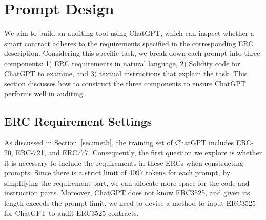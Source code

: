
\section{Prompt Design}







We aim to build an auditing tool using ChatGPT, 
which can inspect whether a smart contract adheres to the requirements specified 
in the corresponding ERC description. 
Considering this specific task, we break down each prompt into three components:
1) ERC requirements in natural language, 2) Solidity code for ChatGPT to examine, 
and 3) textual instructions that explain the task. 
This section discusses how to construct the three components 
to ensure ChatGPT performs well in auditing. 




\subsection{ERC Requirement Settings}
\label{sec:requirement}



As discussed in Section~\ref{sec:meth}, the training set of ChatGPT
includes ERC-20, ERC-721, and ERC777. 
Consequently, the first question we 
explore is whether it is necessary to include the requirements in these ERCs when constructing prompts. 
Since there is a strict limit of 4097 tokens for each prompt, by simplifying the requirement part, we can allocate more space for the code and instruction parts. 
Moreover, 
ChatGPT does not know ERC3525, and given its length exceeds the prompt limit, 
we need to devise a method to input ERC3525 for ChatGPT to audit ERC3525 contracts. 




